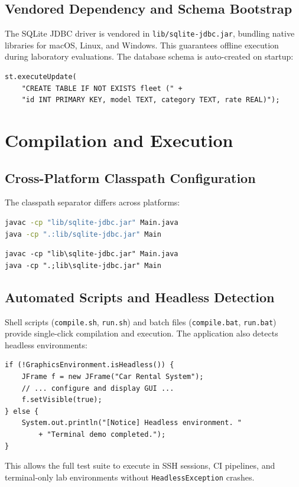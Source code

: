\documentclass[11pt,a4paper]{article}
\begin{document}
\subsection{Vendored Dependency and Schema Bootstrap}
The SQLite JDBC driver is vendored in \texttt{lib/sqlite-jdbc.jar}, bundling native libraries for macOS, Linux, and Windows. This guarantees offline execution during laboratory evaluations. The database schema is auto-created on startup:
\begin{lstlisting}[caption={Automated Schema Bootstrapping}]
st.executeUpdate(
    "CREATE TABLE IF NOT EXISTS fleet (" +
    "id INT PRIMARY KEY, model TEXT, category TEXT, rate REAL)");
\end{lstlisting}

\section{Compilation and Execution}
\label{sec:compilation}

\subsection{Cross-Platform Classpath Configuration}
The classpath separator differs across platforms:
\begin{lstlisting}[language=bash, caption={macOS/Linux Commands}]
javac -cp "lib/sqlite-jdbc.jar" Main.java
java -cp ".:lib/sqlite-jdbc.jar" Main
\end{lstlisting}
\begin{lstlisting}[language={}, caption={Windows Commands}]
javac -cp "lib\sqlite-jdbc.jar" Main.java
java -cp ".;lib\sqlite-jdbc.jar" Main
\end{lstlisting}

\subsection{Automated Scripts and Headless Detection}
Shell scripts (\texttt{compile.sh}, \texttt{run.sh}) and batch files (\texttt{compile.bat}, \texttt{run.bat}) provide single-click compilation and execution. The application also detects headless environments:
\begin{lstlisting}[caption={Headless Environment Detection}]
if (!GraphicsEnvironment.isHeadless()) {
    JFrame f = new JFrame("Car Rental System");
    // ... configure and display GUI ...
    f.setVisible(true);
} else {
    System.out.println("[Notice] Headless environment. "
        + "Terminal demo completed.");
}
\end{lstlisting}
This allows the full test suite to execute in SSH sessions, CI pipelines, and terminal-only lab environments without \texttt{HeadlessException} crashes.
\end{document}
